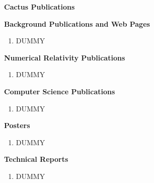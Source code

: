 \documentclass[11pt, tightenlines]{revtex4}
\begin{document}
{\LARGE\bf Cactus Publications}



\hrulefill

{\large\bf Background Publications and Web Pages}

\begin{enumerate}
  \item DUMMY
  
  
\end{enumerate}



\hrulefill

{\large\bf Numerical Relativity Publications}

\begin{enumerate}
  \item DUMMY
  
\end{enumerate}



\hrulefill

{\large\bf Computer Science Publications}

\begin{enumerate}
  \item DUMMY
  
\end{enumerate}



\hrulefill

{\large\bf Posters}

\begin{enumerate}
  \item DUMMY
  
\end{enumerate}



\hrulefill

{\large\bf Technical Reports}

\begin{enumerate}
  \item DUMMY
  
\end{enumerate}
\end{document}
